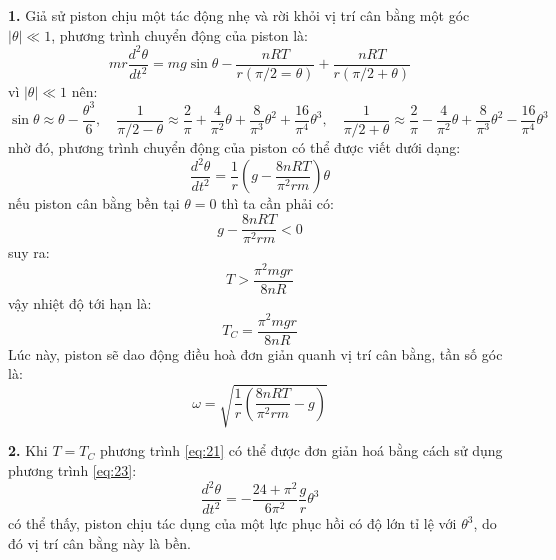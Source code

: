 \noindent \textbf{1.} Giả sử piston chịu một tác động nhẹ và rời khỏi vị trí cân bằng một góc $\lvert\theta\rvert\ll 1$, phương trình chuyển động của piston là:
\begin{equation}
  \label{eq:21}
  mr\frac{d^{2}\theta}{dt^{2}}=mg\sin\theta-\frac{nRT}{r(\pi/2=\theta)}+\frac{nRT}{r(\pi/2+\theta)}
\end{equation}
vì $\lvert\theta\rvert\ll 1$ nên:
\begin{equation}
  \label{eq:22}
  \sin\theta\approx\theta-\frac{\theta^{3}}{6},\quad \frac{1}{\pi/2-\theta}\approx\frac{2}{\pi}+\frac{4}{\pi^{2}}\theta+\frac{8}{\pi^{3}}\theta^{2}+\frac{16}{\pi^{4}}\theta^{3},\quad \frac{1}{\pi/2+\theta}\approx\frac{2}{\pi}-\frac{4}{\pi^{2}}\theta+\frac{8}{\pi^{3}}\theta^{2}-\frac{16}{\pi^{4}}\theta^{3}
\end{equation}
nhờ đó, phương trình chuyển động của piston có thể được viết dưới dạng:
\begin{equation}
  \label{eq:23}
  \frac{d^{2}\theta}{dt^{2}}=\frac{1}{r}\left(g-\frac{8nRT}{\pi^{2}rm}\right)\theta
\end{equation}
nếu piston cân bằng bền tại $\theta=0$ thì ta cần phải có:
\begin{equation}
  \label{eq:24}
  g-\frac{8nRT}{\pi^{2}rm} < 0
\end{equation}
suy ra:
\begin{equation}
  \label{eq:25}
  T>\frac{\pi^{2}mgr}{8nR}
\end{equation}
vậy nhiệt độ tới hạn là:
\begin{equation}
  \label{eq:26}
  T_{C}=\frac{\pi^{2}mgr}{8nR}
\end{equation}
Lúc này, piston sẽ dao động điều hoà đơn giản quanh vị trí cân bằng, tần số góc là:
\begin{equation}
  \label{eq:27}
  \omega=\sqrt{\frac{1}{r}\left(\frac{8nRT}{\pi^{2}rm}-g\right)}
\end{equation}

\noindent\textbf{2.} Khi $T=T_{C}$ phương trình \eqref{eq:21} có thể được đơn giản hoá bằng cách sử dụng phương trình \eqref{eq:23}:
\begin{equation}
  \label{eq:28}
  \frac{d^{2}\theta}{dt^{2}}=-\frac{24+\pi^{2}}{6\pi^{2}}\frac{g}{r}\theta^{3}
\end{equation}
có thể thấy, piston chịu tác dụng của một lực phục hồi có độ lớn tỉ lệ với $\theta^{3}$, do đó vị trí cân bằng này là bền.\\

